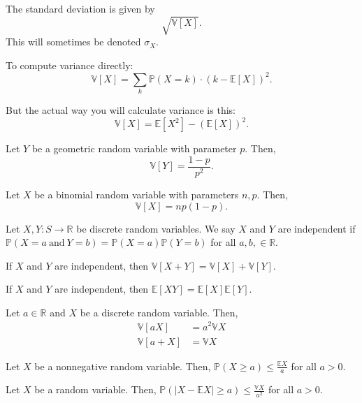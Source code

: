 \documentclass{article}
\begin{document}
    The standard deviation is given by $$\sqrt{\mathbb V[X]}.$$ This will sometimes be denoted $\sigma_X$.
    
    To compute variance directly: $$\mathbb V[X] = \sum_k \mathbb P(X = k) \cdot (k - \mathbb E[X])^2.$$
    
    But the actual way you will calculate variance is this: $$\mathbb V[X] = \mathbb E[X^2] - (\mathbb E[X])^2.$$
    
\medskip
{}

    Let $Y$ be a geometric random variable with parameter $p$. Then, $$\mathbb V[Y] = \frac{1-p}{p^2}.$$
    
\medskip
{}

    Let $X$ be a binomial random variable with parameters $n, p$. Then, $$\mathbb V[X] = np(1-p).$$
    
\medskip
{}

    Let $X,Y: S \to \mathbb R$ be discrete random variables. We say $X$ and $Y$ are independent if $\mathbb P(X=a~\text{and}~Y=b) = \mathbb P(X=a) \mathbb P(Y = b)$ for all $a,b, \in \mathbb R$.
    
\medskip
{}

    If $X$ and $Y$ are independent, then $\mathbb V[X+Y]=\mathbb V[X] + \mathbb V[Y]$.
    
\medskip
{}

    If $X$ and $Y$ are independent, then $\mathbb E[XY] = \mathbb E[X] \mathbb E[Y]$.
    
\medskip
{}

    Let $a \in \mathbb R$ and $X$ be a discrete random variable. Then, \begin{align*}
        \mathbb V[aX]    &= a^2\mathbb VX \\
        \mathbb V[a + X] &= \mathbb VX
    \end{align*}
    
\medskip
{}

    Let $X$ be a nonnegative random variable. Then, $\mathbb P(X \geq a) \leq \frac{\mathbb EX}{a}$ for all $a > 0$.
    
\medskip
{}

    Let $X$ be a         random variable. Then, $\mathbb P(|X - \mathbb EX| \geq a) \leq \frac{\mathbb VX}{a^2}$ for all $a > 0$.
    
\end{document}
